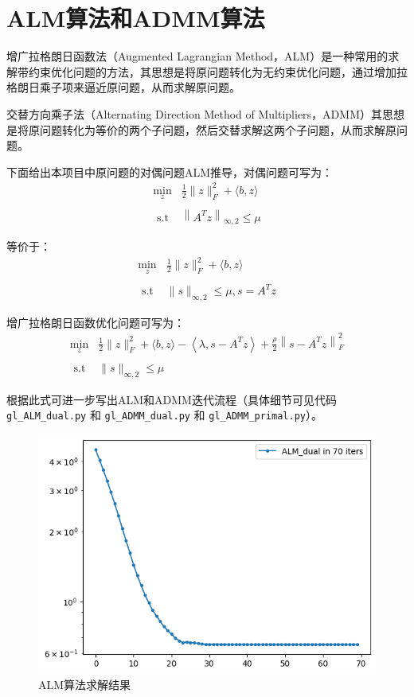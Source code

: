 \documentclass[journal, a4paper]{IEEEtran}
\begin{document}
\section{\textbf{ALM算法和ADMM算法}}

增广拉格朗日函数法（Augmented Lagrangian Method，ALM）是一种常用的求解带约束优化问题的方法，其思想是将原问题转化为无约束优化问题，通过增加拉格朗日乘子项来逼近原问题，从而求解原问题。

交替方向乘子法（Alternating Direction Method of Multipliers，ADMM）其思想是将原问题转化为等价的两个子问题，然后交替求解这两个子问题，从而求解原问题。

下面给出本项目中原问题的对偶问题ALM推导，对偶问题可写为：
$$
\begin{array}{cl}
\min _z & \frac{1}{2}\|z\|_F^2+\langle b, z\rangle  \\
\\
\text { s.t } & \left\|A^T z\right\|_{\infty, 2} \leq \mu
\end{array}
$$  

等价于：  
$$
\begin{array}{ll}
\min _z & \frac{1}{2}\|z\|_F^2+\langle b, z\rangle \\
\\
\text { s.t } & \|s\|_{\infty, 2} \leq \mu, s=A^T z
\end{array}
$$  

增广拉格朗日函数优化问题可写为：  
$$
\begin{aligned}
\min _z & \frac{1}{2}\|z\|_F^2+\langle b, z\rangle-\left\langle\lambda, s-A^T z\right\rangle+\frac{\rho}{2}\left\|s-A^T z\right\|_F^2 \\
\\
\text { s.t } & \|s\|_{\infty, 2} \leq \mu
\end{aligned}
$$

根据此式可进一步写出ALM和ADMM迭代流程（具体细节可见代码\texttt{gl\_ALM\_dual.py} 和 \texttt{gl\_ADMM\_dual.py} 和 \texttt{gl\_ADMM\_primal.py}）。

\begin{figure}[htbp]
    \centering
    \includegraphics[width=0.9\columnwidth]{img/ALM.png}
    {\centering \small \caption{ALM算法求解结果\label{fig:ALM}}}
\end{figure}
\end{document}
